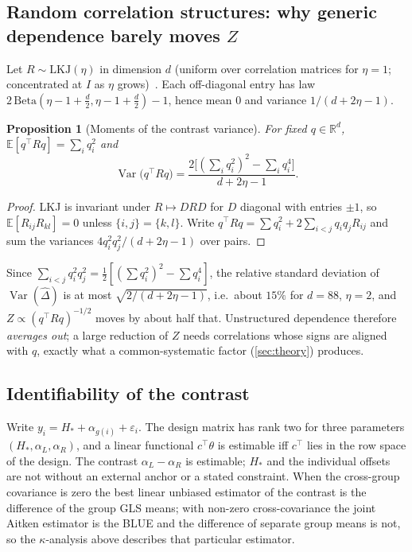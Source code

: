 \documentclass[11pt,a4paper]{article}
\newtheorem{proposition}{Proposition}
\theoremstyle{remark}\newtheorem{remark}{Remark}
\DeclareMathOperator{\Var}{Var}\DeclareMathOperator{\Cov}{Cov}\DeclareMathOperator{\Corr}{Corr}
\begin{document}
\subsection{Random correlation structures: why generic dependence barely moves $Z$}
Let $R\sim\mathrm{LKJ}(\eta)$ in dimension $d$ (uniform over correlation matrices for $\eta=1$; concentrated at $I$ as $\eta$ grows)~\cite{LKJ2009}. Each off-diagonal entry has law $2\,\mathrm{Beta}(\eta{-}1{+}\tfrac d2,\eta{-}1{+}\tfrac d2)-1$, hence mean $0$ and variance $1/(d+2\eta-1)$.
\begin{proposition}[Moments of the contrast variance]\label{prop:lkj}
For fixed $q\in\mathbb R^d$, $\mathbb E[q^{\!\top}Rq]=\sum_iq_i^2$ and
\begin{equation}
\Var\bigl(q^{\!\top}Rq\bigr)=\frac{2\bigl[(\sum_iq_i^2)^2-\sum_iq_i^4\bigr]}{d+2\eta-1}.
\end{equation}
\end{proposition}
\begin{proof}
LKJ is invariant under $R\mapsto DRD$ for $D$ diagonal with entries $\pm1$, so $\mathbb E[R_{ij}R_{kl}]=0$ unless $\{i,j\}=\{k,l\}$. Write $q^{\!\top}Rq=\sum q_i^2+2\sum_{i<j}q_iq_jR_{ij}$ and sum the variances $4q_i^2q_j^2/(d+2\eta-1)$ over pairs.
\end{proof}
\noindent Since $\sum_{i<j}q_i^2q_j^2=\tfrac12[(\sum q_i^2)^2-\sum q_i^4]$, the relative standard deviation of $\Var(\widehat\Delta)$ is at most $\sqrt{2/(d+2\eta-1)}$, i.e.\ about $15\%$ for $d=88$, $\eta=2$, and $Z\propto(q^{\!\top}Rq)^{-1/2}$ moves by about half that. Unstructured dependence therefore \emph{averages out}; a large reduction of $Z$ needs correlations whose signs are aligned with $q$, exactly what a common-systematic factor (\cref{sec:theory}) produces.

\subsection{Identifiability of the contrast}
Write $y_i=H_\ast+\alpha_{g(i)}+\varepsilon_i$. The design matrix has rank two for three parameters $(H_\ast,\alpha_L,\alpha_R)$, and a linear functional $c^{\!\top}\theta$ is estimable iff $c^{\!\top}$ lies in the row space of the design. The contrast $\alpha_L-\alpha_R$ is estimable; $H_\ast$ and the individual offsets are not without an external anchor or a stated constraint. When the cross-group covariance is zero the best linear unbiased estimator of the contrast is the difference of the group GLS means; with non-zero cross-covariance the joint Aitken estimator is the BLUE and the difference of separate group means is not, so the $\kappa$-analysis above describes that particular estimator.
\end{document}
